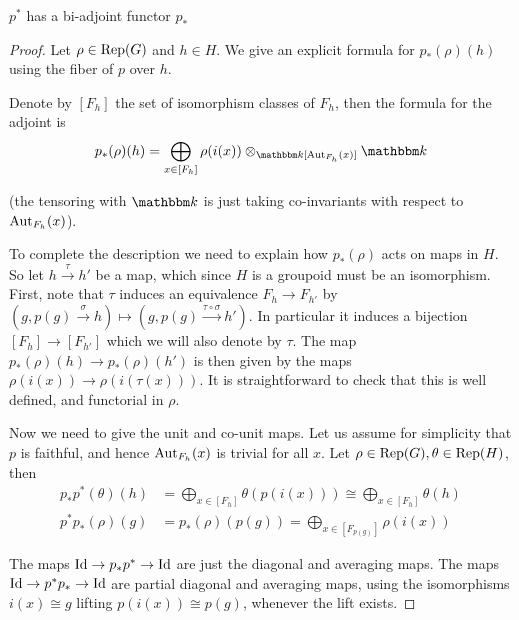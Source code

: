 \begin{Proposition}
$p^*$ has a bi-adjoint functor $p_*$
\end{Proposition}
\begin{proof}
Let $\rho\in\operatorname{Rep}(G)$ and $h\in H$. We give an explicit formula for $p_*(\rho)(h)$ using the fiber of $p$ over $h$.

Denote by $[F_h]$ the set of isomorphism classes of $F_h$, then the formula for the adjoint is
\begin{equation}
p_*(\rho)(h)=\bigoplus_{x\in [F_h]} \rho(i(x))\otimes_{\field [\Aut_{F_h}(x)]}\field
\end{equation}

(the tensoring with $\field$ is just taking co-invariants with respect to $\operatorname{Aut}_{F_h}(x)$).

To complete the description we need to explain how $p_*(\rho)$ acts on maps in $H$. So let $h\xrightarrow{\tau}h'$ be a map, which since $H$ is a groupoid must be an isomorphism. First, note that $\tau$ induces an equivalence $F_h\to F_{h'}$ by $(g, p(g)\xrightarrow{\sigma} h)\mapsto(g, p(g)\xrightarrow{\tau\circ\sigma} h') $. In particular it induces a bijection $[F_h]\to [F_{h'}]$ which we will also denote by $\tau$. The map $p_*(\rho)(h)\to p_*(\rho)(h')$ is then given by the maps $\rho(i(x))\to\rho(i(\tau(x)))$. It is straightforward to check that this is well defined, and functorial in $\rho$.

Now we need to give the unit and co-unit maps. Let us assume for simplicity that $p$ is faithful, and hence $\operatorname{Aut}_{F_h}(x)$ is trivial for all $x$. Let $\rho\in\operatorname{Rep}(G),\theta\in\operatorname{Rep}(H)$, then
\begin{eqnarray}
p_*p^*(\theta)(h)&=\bigoplus_{x\in [F_h]} \theta(p(i(x)))\cong \bigoplus_{x\in [F_h]} \theta(h)\\
p^*p_*(\rho)(g)&=p_*(\rho)(p(g))=\bigoplus_{x\in [F_{p(g)}]} \rho(i(x))
\end{eqnarray}

The maps $\operatorname{Id}\to p_*p^* \to \operatorname{Id}$ are just the diagonal and averaging maps. The maps $\operatorname{Id}\to p^*p_* \to \operatorname{Id}$ are partial diagonal and averaging maps, using the isomorphisms $i(x)\cong g$ lifting $p(i(x))\cong p(g)$, whenever the lift exists.
\end{proof}